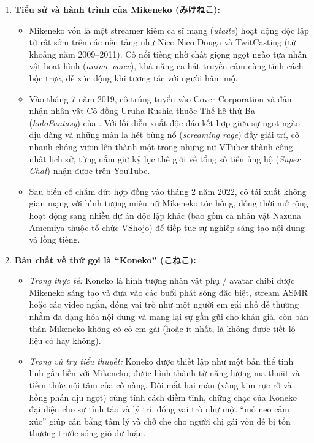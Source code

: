 ﻿\documentclass[../main.tex]{subfiles}
\begin{document}
\begin{enumerate}
    \item \textbf{Tiểu sử và hành trình của Mikeneko (みけねこ):}
          \begin{itemize}
              \item Mikeneko vốn là một streamer kiêm ca sĩ mạng (\textit{utaite}) hoạt động độc lập từ rất sớm trên các nền tảng như Nico Nico Douga và TwitCasting (từ khoảng năm 2009--2011). Cô nổi tiếng nhờ chất giọng ngọt ngào tựa nhân vật hoạt hình (\textit{anime voice}), khả năng ca hát truyền cảm cùng tính cách bộc trực, dễ xúc động khi tương tác với người hâm mộ.
              \item Vào tháng 7 năm 2019, cô trúng tuyển vào Cover Corporation và đảm nhận nhân vật Cô đồng Uruha Rushia thuộc Thế hệ thứ Ba (\textit{holoFantasy}) của \hll. Với lối diễn xuất độc đáo kết hợp giữa sự ngọt ngào dịu dàng và những màn la hét bùng nổ (\textit{screaming rage}) đầy giải trí, cô nhanh chóng vươn lên thành một trong những nữ VTuber thành công nhất lịch sử, từng nắm giữ kỷ lục thế giới về tổng số tiền ủng hộ (\textit{Super Chat}) nhận được trên YouTube.
              \item Sau biến cố chấm dứt hợp đồng vào tháng 2 năm 2022, cô tái xuất không gian mạng với hình tượng miêu nữ Mikeneko tóc hồng, đồng thời mở rộng hoạt động sang nhiều dự án độc lập khác (bao gồm cả nhân vật Nazuna Amemiya thuộc tổ chức VShojo) để tiếp tục sự nghiệp sáng tạo nội dung và lồng tiếng.
          \end{itemize}

    \item \textbf{Bản chất về thứ gọi là ``Koneko'' (こねこ):}
          \begin{itemize}
              \item \emph{Trong thực tế:} Koneko là hình tượng nhân vật phụ / avatar chibi được Mikeneko sáng tạo và đưa vào các buổi phát sóng đặc biệt, stream ASMR hoặc các video ngắn, đóng vai trò như một người em gái nhỏ dễ thương nhằm đa dạng hóa nội dung và mang lại sự gần gũi cho khán giả, còn bản thân Mikeneko không có cô em gái (hoặc ít nhất, là không được tiết lộ liệu có hay không).
              \item \emph{Trong vũ trụ tiểu thuyết:} Koneko được thiết lập như một bản thể tinh linh gắn liền với Mikeneko, được hình thành từ năng lượng ma thuật và tiềm thức nội tâm của cô nàng. Đôi mắt hai màu (vàng kim rực rỡ và hồng phấn dịu ngọt) cùng tính cách điềm tĩnh, chững chạc của Koneko đại diện cho sự tỉnh táo và lý trí, đóng vai trò như một ``mỏ neo cảm xúc'' giúp cân bằng tâm lý và chở che cho người chị gái vốn dễ bị tổn thương trước sóng gió dư luận.
          \end{itemize}
\end{enumerate}
\end{document}

